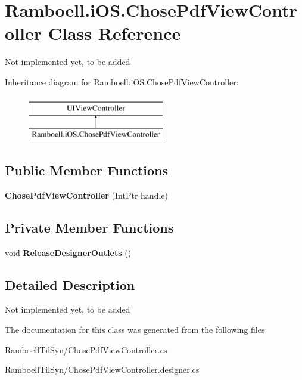 \hypertarget{class_ramboell_1_1i_o_s_1_1_chose_pdf_view_controller}{}\section{Ramboell.\+i\+O\+S.\+Chose\+Pdf\+View\+Controller Class Reference}
\label{class_ramboell_1_1i_o_s_1_1_chose_pdf_view_controller}


Not implemented yet, to be added  


Inheritance diagram for Ramboell.\+i\+O\+S.\+Chose\+Pdf\+View\+Controller\+:\begin{figure}[H]
\begin{center}
\leavevmode
\includegraphics[height=2.000000cm]{class_ramboell_1_1i_o_s_1_1_chose_pdf_view_controller}
\end{center}
\end{figure}
\subsection*{Public Member Functions}
\begin{DoxyCompactItemize}
\item 
\mbox{\label{class_ramboell_1_1i_o_s_1_1_chose_pdf_view_controller_afa454435a512e52b9a10840d0cceb671}} 
{\bfseries Chose\+Pdf\+View\+Controller} (Int\+Ptr handle)
\end{DoxyCompactItemize}
\subsection*{Private Member Functions}
\begin{DoxyCompactItemize}
\item 
\mbox{\label{class_ramboell_1_1i_o_s_1_1_chose_pdf_view_controller_ab05425d202701de77743977bf74ee4e4}} 
void {\bfseries Release\+Designer\+Outlets} ()
\end{DoxyCompactItemize}


\subsection{Detailed Description}
Not implemented yet, to be added 



The documentation for this class was generated from the following files\+:\begin{DoxyCompactItemize}
\item 
Ramboell\+Til\+Syn/Chose\+Pdf\+View\+Controller.\+cs\item 
Ramboell\+Til\+Syn/Chose\+Pdf\+View\+Controller.\+designer.\+cs\end{DoxyCompactItemize}
